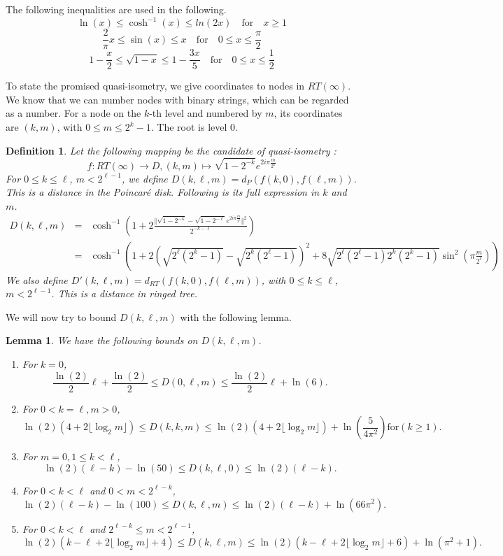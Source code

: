\documentclass[11pt]{article}
\newtheorem{lem}{Lemma}
\newtheorem{defi}{Definition}
\begin{document}
The following inequalities are used in the following.
\[ \ln(x) \leq \cosh^{-1}(x) \leq ln(2x) \quad \mathrm{for} \quad x \geq 1 \]
\[ \frac{2}{\pi}x \leq \sin(x) \leq x \quad \mathrm{for} \quad 0 \leq x \leq \frac{\pi}{2} \]
\[ 1 - \frac{x}{2} \leq \sqrt{1-x} \leq 1 - \frac{3x}{5} \quad \mathrm{for} \quad 0 \leq x \leq \frac{1}{2} \]

To state the promised quasi-isometry, we give coordinates to nodes in $RT(\infty)$. We know that we can number nodes with binary strings, which can be regarded as a number. For a node on the $k$-th level and numbered by $m$, its coordinates are $(k,m)$, with $0 \leq m \leq 2^{k}-1$. The root is level $0$.

\begin{defi}
Let the following mapping be the candidate of quasi-isometry :
\[ f: RT(\infty) \to D, (k,m) \mapsto \sqrt{1-2^{-k}} e^{2i\pi \frac{m}{2^{k}}} \]
For $0 \leq k \leq \ell$, $m < 2^{\ell-1}$, we define $D(k,\ell,m)=d_{P}(f(k,0),f(\ell,m))$. This is a distance in the Poincar\'{e} disk. Following is its full expression in $k$ and $m$.
\begin{eqnarray*}
D(k ,\ell ,m) & = & \cosh^{-1}(1+2\frac{\Vert \sqrt{1-2^{-k}} - \sqrt{1-2^{-\ell}} e^{2i\pi \frac{m}{2^{\ell}}} \Vert^{2}}{2^{-k-\ell}}) \\
& = & \cosh^{-1}(1 + 2(\sqrt{2^{\ell}(2^{k}-1)} - \sqrt{2^{k}(2^{\ell}-1)})^2 + 8\sqrt{2^{\ell}(2^{\ell}-1)2^{k}(2^{k}-1)}\sin^{2}(\pi \frac{m}{2^{\ell}}))
\end{eqnarray*}
We also define $D'(k,\ell,m)=d_{RT}(f(k,0),f(\ell,m))$, with $0 \leq k \leq \ell$, $m < 2^{\ell-1}$. This is a distance in ringed tree.
\end{defi}

We will now try to bound $D(k,\ell,m)$ with the following lemma.

\begin{lem}\label{lem:quasi-iso-bound}
We have the following bounds on $D(k, \ell, m)$.
\begin{enumerate}
\item For $k=0$,
\[ \frac{\ln(2)}{2}\ell + \frac{\ln(2)}{2} \leq D(0, \ell, m) \leq \frac{\ln(2)}{2}\ell + \ln(6). \]
\item For $0 < k=\ell, m > 0$,
\[ \ln(2)(4 + 2\lfloor \log_2 m \rfloor) \leq D(k,k,m) \leq \ln(2)(4 + 2\lfloor \log_2 m \rfloor) + \ln(\frac{5}{4\pi^{2}}) \mathrm{for} (k \geq 1). \]
\item For $m=0, 1 \leq k < \ell$, 
\[ \ln(2)(\ell - k) - \ln(50) \leq D(k, \ell, 0) \leq \ln(2)(\ell - k). \]
\item For $0 < k < \ell$ and $0 < m < 2^{\ell-k}$,
\[ \ln(2)(\ell - k) - \ln(100) \leq D(k,\ell,m) \leq \ln(2)(\ell - k) + \ln(66 \pi^{2}). \]
\item For $0 < k < \ell$ and $2^{\ell-k} \leq m < 2^{\ell - 1}$,
\[ \ln(2)(k - \ell + 2\lfloor \log_2 m \rfloor + 4) \leq D(k,\ell,m) \leq \ln(2)(k - \ell + 2\lfloor \log_2 m \rfloor + 6) + \ln(\pi^{2} + 1). \]
\end{enumerate}
\end{lem}
\end{document}
